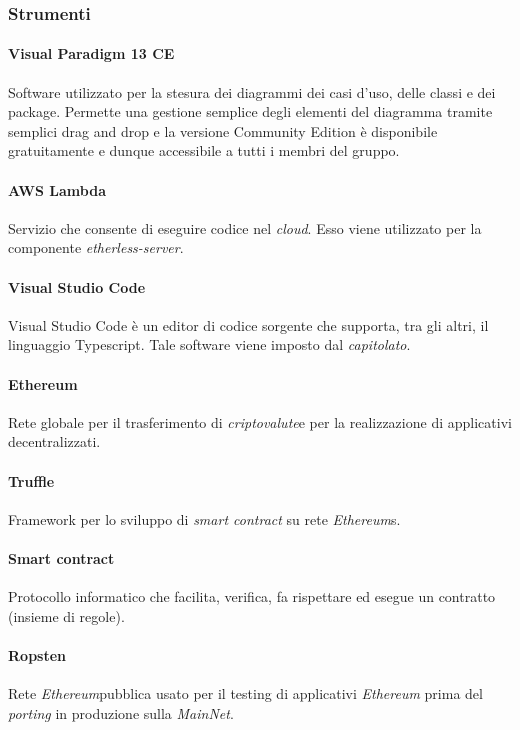 \subsubsection{Strumenti}
\paragraph{Visual Paradigm 13 CE}
Software utilizzato per la stesura dei diagrammi dei casi d'uso, delle classi e dei package. Permette una gestione semplice degli elementi del diagramma tramite semplici drag and drop e la versione Community Edition è disponibile gratuitamente e dunque accessibile a tutti i membri del gruppo.

\paragraph{AWS Lambda}
Servizio che consente di eseguire codice nel \textit{cloud}\glos. Esso viene utilizzato per la componente \textit{etherless-server}.

\paragraph{Visual Studio Code}
Visual Studio Code è un editor di codice sorgente che supporta, tra gli altri, il linguaggio Typescript. Tale software viene imposto dal \textit{capitolato\glos}.

\paragraph{Ethereum\glo}
Rete globale per il trasferimento di \textit{criptovalute}\glo e per la realizzazione di applicativi decentralizzati.

\paragraph{Truffle}
Framework per lo sviluppo di \textit{smart contract\glo} su rete \textit{Ethereum\glo}s.

\paragraph{Smart contract\glo}
Protocollo informatico che facilita, verifica, fa rispettare ed esegue un
contratto (insieme di regole).

\paragraph{Ropsten}
Rete \textit{Ethereum}\glo pubblica usato per il testing di applicativi \textit{Ethereum\glo} prima
del \textit{porting\glo} in produzione sulla \textit{MainNet\glos}.


